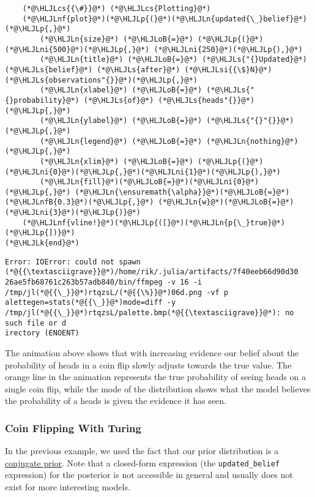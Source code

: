 \documentclass[12pt,a4paper]{article}
\newcommand{\HLJLk}[1]{\textcolor[RGB]{148,91,176}{\textbf{#1}}}
\newcommand{\HLJLn}[1]{#1}
\newcommand{\HLJLnf}[1]{\textcolor[RGB]{66,102,213}{#1}}
\newcommand{\HLJLs}[1]{\textcolor[RGB]{201,61,57}{#1}}
\newcommand{\HLJLsi}[1]{#1}
\newcommand{\HLJLnfB}[1]{\textcolor[RGB]{59,151,46}{#1}}
\newcommand{\HLJLni}[1]{\textcolor[RGB]{59,151,46}{#1}}
\newcommand{\HLJLoB}[1]{\textcolor[RGB]{102,102,102}{\textbf{#1}}}
\newcommand{\HLJLp}[1]{#1}
\newcommand{\HLJLcs}[1]{\textcolor[RGB]{153,153,119}{\textit{#1}}}
\begin{document}
\begin{lstlisting}
    (*@\HLJLcs{{\#}}@*) (*@\HLJLcs{Plotting}@*)
    (*@\HLJLnf{plot}@*)(*@\HLJLp{(}@*)(*@\HLJLn{updated{\_}belief}@*)(*@\HLJLp{,}@*) 
        (*@\HLJLn{size}@*) (*@\HLJLoB{=}@*) (*@\HLJLp{(}@*)(*@\HLJLni{500}@*)(*@\HLJLp{,}@*) (*@\HLJLni{250}@*)(*@\HLJLp{),}@*) 
        (*@\HLJLn{title}@*) (*@\HLJLoB{=}@*) (*@\HLJLs{"{}Updated}@*) (*@\HLJLs{belief}@*) (*@\HLJLs{after}@*) (*@\HLJLsi{{\$}N}@*) (*@\HLJLs{observations"{}}@*)(*@\HLJLp{,}@*)
        (*@\HLJLn{xlabel}@*) (*@\HLJLoB{=}@*) (*@\HLJLs{"{}probability}@*) (*@\HLJLs{of}@*) (*@\HLJLs{heads"{}}@*)(*@\HLJLp{,}@*) 
        (*@\HLJLn{ylabel}@*) (*@\HLJLoB{=}@*) (*@\HLJLs{"{}"{}}@*)(*@\HLJLp{,}@*) 
        (*@\HLJLn{legend}@*) (*@\HLJLoB{=}@*) (*@\HLJLn{nothing}@*)(*@\HLJLp{,}@*)
        (*@\HLJLn{xlim}@*) (*@\HLJLoB{=}@*) (*@\HLJLp{(}@*)(*@\HLJLni{0}@*)(*@\HLJLp{,}@*)(*@\HLJLni{1}@*)(*@\HLJLp{),}@*)
        (*@\HLJLn{fill}@*)(*@\HLJLoB{=}@*)(*@\HLJLni{0}@*)(*@\HLJLp{,}@*) (*@\HLJLn{\ensuremath{\alpha}}@*)(*@\HLJLoB{=}@*)(*@\HLJLnfB{0.3}@*)(*@\HLJLp{,}@*) (*@\HLJLn{w}@*)(*@\HLJLoB{=}@*)(*@\HLJLni{3}@*)(*@\HLJLp{)}@*)
    (*@\HLJLnf{vline!}@*)(*@\HLJLp{([}@*)(*@\HLJLn{p{\_}true}@*)(*@\HLJLp{])}@*)
(*@\HLJLk{end}@*)
\end{lstlisting}

\begin{lstlisting}
Error: IOError: could not spawn (*@{{\textasciigrave}}@*)/home/rik/.julia/artifacts/7f40eeb66d90d30
26ae5fb68761c263b57adb840/bin/ffmpeg -v 16 -i /tmp/jl(*@{{\_}}@*)rtqzsL/(*@{{\%}}@*)06d.png -vf p
alettegen=stats(*@{{\_}}@*)mode=diff -y /tmp/jl(*@{{\_}}@*)rtqzsL/palette.bmp(*@{{\textasciigrave}}@*): no such file or d
irectory (ENOENT)
\end{lstlisting}


The animation above shows that with increasing evidence our belief about the probability of heads in a coin flip slowly adjusts towards the true value. The orange line in the animation represents the true probability of seeing heads on a single coin flip, while the mode of the distribution shows what the model believes the probability of a heads is given the evidence it has seen.

\subsubsection{Coin Flipping With Turing}
In the previous example, we used the fact that our prior distribution is a \href{https://en.wikipedia.org/wiki/Conjugate_prior}{conjugate prior}. Note that a closed-form expression (the \texttt{updated\_belief} expression) for the posterior is not accessible in general and usually does not exist for more interesting models. 
\end{document}

